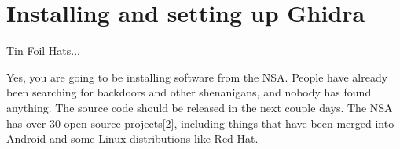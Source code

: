 \documentclass{beamer}
\begin{document}
\section{Installing and setting up Ghidra}
\begin{frame}{Tin Foil Hats...}

  Yes, you are going to be installing software from the NSA. People
  have already been searching for backdoors and other shenanigans, and
  nobody has found anything. The source code should be released in the
  next couple days. The NSA has over 30 open source projects[2],
  including things that have been merged into Android and some Linux
  distributions like Red Hat.
\end{frame}
\end{document}
